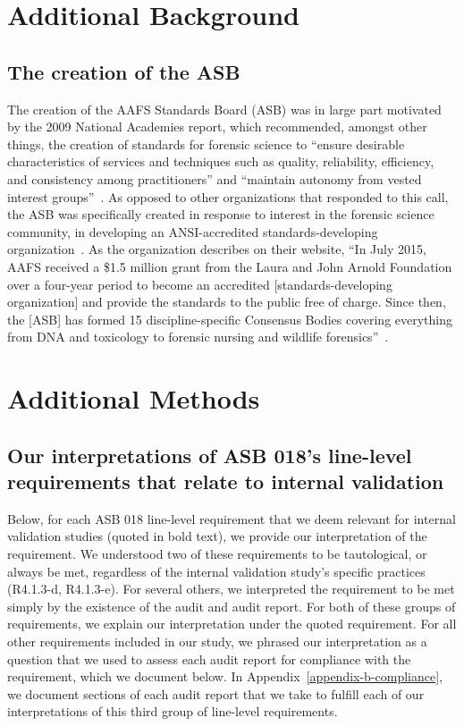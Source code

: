 \section{Additional Background}
\subsection{The creation of the ASB}
\label{appendix-a}
The creation of the AAFS Standards Board (ASB) was in large part motivated by the 2009 National Academies report, which recommended, amongst other things, the creation of standards for forensic science to ``ensure desirable characteristics of services and techniques such as quality, reliability, efficiency, and consistency among practitioners'' and ``maintain autonomy from vested interest groups''~\cite{national2009strengthening}. As opposed to other organizations that responded to this call, the ASB was specifically created in response to interest in the forensic science community, in developing an ANSI-accredited standards-developing organization~\cite{ambrosius2025celebrating}. As the organization describes on their website, ``In July 2015, AAFS received a \$1.5 million grant from the Laura and John Arnold Foundation over a four-year period to become an accredited [standards-developing organization] and provide the standards to the public free of charge. Since then, the [ASB] has formed 15 discipline-specific Consensus Bodies covering everything from DNA and toxicology to forensic nursing and wildlife forensics''~\cite{ambrosius2025celebrating}.

\section{Additional Methods}
\label{sec:appendix-b}
\subsection{Our interpretations of ASB 018's line-level requirements that relate to internal validation}
\label{sec:appendix-b-interpretations}
Below, for each ASB 018 line-level requirement that we deem relevant for internal validation studies (quoted in bold text), we provide our interpretation of the requirement. We understood two of these requirements to be tautological, or always be met, regardless of the internal validation study's specific practices (R4.1.3-d, R4.1.3-e). For several others, we interpreted the requirement to be met simply by the existence of the audit and audit report. For both of these groups of requirements, we explain our interpretation under the quoted requirement. For all other requirements included in our study, we phrased our interpretation as a question that we used to assess each audit report for compliance with the requirement, which we document below. In Appendix~\ref{appendix-b-compliance}, we document sections of each audit report that we take to fulfill each of our interpretations of this third group of line-level requirements.

